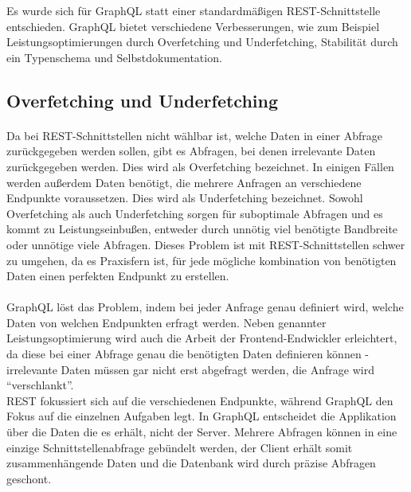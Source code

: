 Es wurde sich für GraphQL statt einer standardmäßigen REST-Schnittstelle entschieden.
GraphQL bietet verschiedene Verbesserungen, wie zum Beispiel Leistungsoptimierungen durch Overfetching und Underfetching, Stabilität durch ein Typenschema und Selbstdokumentation.

\subsection{Overfetching und Underfetching}
\paragraph{}
Da bei REST-Schnittstellen nicht wählbar ist, welche Daten in einer Abfrage zurückgegeben werden sollen, gibt es Abfragen, bei denen irrelevante Daten zurückgegeben werden.
Dies wird als Overfetching bezeichnet.
In einigen Fällen werden außerdem Daten benötigt, die mehrere Anfragen an verschiedene Endpunkte voraussetzen.
Dies wird als Underfetching bezeichnet.
Sowohl Overfetching als auch Underfetching sorgen für suboptimale Abfragen und es kommt zu Leistungseinbußen, entweder durch unnötig viel benötigte Bandbreite oder unnötige viele Abfragen.
Dieses Problem ist mit REST-Schnittstellen schwer zu umgehen, da es Praxisfern ist, für jede mögliche kombination von benötigten Daten einen perfekten Endpunkt zu erstellen.

\paragraph{}
GraphQL löst das Problem, indem bei jeder Anfrage genau definiert wird, welche Daten von welchen Endpunkten erfragt werden.
Neben genannter Leistungsoptimierung wird auch die Arbeit der Frontend-Endwickler erleichtert, da diese bei einer Abfrage genau die benötigten Daten definieren können - irrelevante Daten müssen gar nicht erst abgefragt werden, die Anfrage wird \enquote{verschlankt}.\\
REST fokussiert sich auf die verschiedenen Endpunkte, während GraphQL den Fokus auf die einzelnen Aufgaben legt.
In GraphQL entscheidet die Applikation über die Daten die es erhält, nicht der Server.
Mehrere Abfragen können in eine einzige Schnittstellenabfrage gebündelt werden, der Client erhält somit zusammenhängende Daten und die Datenbank wird durch präzise Abfragen geschont.

